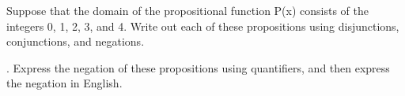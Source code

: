 \documentclass{exam}
\begin{document}
\begin{questions}
\question Suppose that the domain of the propositional function
P(x) consists of the integers 0, 1, 2, 3, and 4. Write out
each of these propositions using disjunctions, conjunctions, and negations.


\question . Express the negation of these propositions using quantifiers, and then express the negation in English.
\end{questions}
\end{document}
